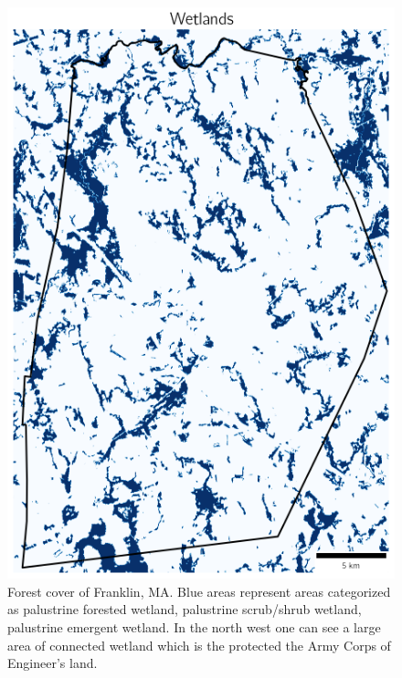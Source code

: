 \documentclass[12pt, stu, floatsintext,table]{apa7}
\begin{document}
\begin{figure}[H]
    \centering
    \includegraphics[width=0.75\linewidth]{figures/wet_cover.png}
    \caption{Forest cover of Franklin, MA. Blue areas represent areas categorized as palustrine forested wetland, palustrine scrub/shrub wetland, palustrine emergent wetland. In the north west one can see a large area of connected wetland which is the protected the Army Corps of Engineer's land.  }
\end{figure}
\end{document}
